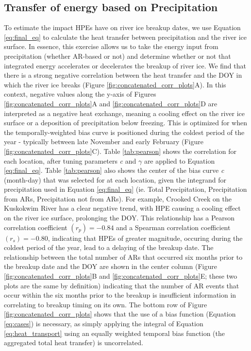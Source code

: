 \documentclass[12pts,draft]{AR_analysis_}
\begin{document}
\subsection{Transfer of energy based on Precipitation}

To estimate the impact HPEs have on river ice breakup dates, we use 
Equation \ref{eq:final_eq} to calculate the heat transfer
between precipitation and the river ice surface. In essence, this 
exercise allows us to take the energy input from precipitation 
(whether AR-based or not) and determine whether or not that integrated 
energy accelerates or decelerates the breakup of river ice. 
We find that there is a strong negative correlation between the heat 
transfer and the DOY 
in which the river ice breaks (Figure
\ref{fig:concatenated_corr_plots}A). In this context, negative values 
along the y-axis of Figures \ref{fig:concatenated_corr_plots}A and 
\ref{fig:concatenated_corr_plots}D 
are interpreted
as a negative heat exchange, meaning a cooling effect on the river ice
surface or a deposition of precipitation below freezing. This is optimized for 
when the temporally-weighted bias curve
is positioned during the coldest period of the year - typically between
late November and early February (Figure \ref{fig:concatenated_corr_plots}C).
Table \ref{tab:pearson} shows the correlation for each location, after
tuning parameters \emph{c} and $\gamma$ are applied to Equation \ref{eq:final_eq}.
Table \ref{tab:pearson} also shows the center of the bias curve \emph{c} (month-day)
that was selected for at each location, given the integrand for precipitation used in
Equation \ref{eq:final_eq} (ie. Total Precipitation, Precipitation from ARs, Precipitation
not from ARs). 
For example, Crooked Creek on the Kuskokwim River has a
clear negative trend, with HPE causing a cooling effect on the
river ice surface, prolonging the DOY. This relationship has a Pearson correlation
coefficient $ (r_{p} )= -0.84$ and a Spearman correlation coefficient
$(r_{s}) = -0.80$, indicating that HPEs of greater magnitude, occuring 
during the coldest period of the year, lead to a delaying of the breakup date. 
The relationship between the total
number of ARs that occurred six months prior to the breakup date and the
DOY are shown in the center column 
(Figure \ref{fig:concatenated_corr_plots}B and 
\ref{fig:concatenated_corr_plots}E; 
these two plots are the same by
definition) indicating that the number of AR 
events that occur within the six months prior to the breakup
is insufficient information 
in correlating to breakup timing on its own. The
bottom row of Figure \ref{fig:concatenated_corr_plots} shows that the
use of a bias function (Equation \ref{eq:cases}) is necessary, as simply 
applying the integral of Equation \ref{eq:heat_transport} using an 
equally weighted temporal bias function (the aggregated total heat 
transfer) is uncorrelated. 
\end{document}
